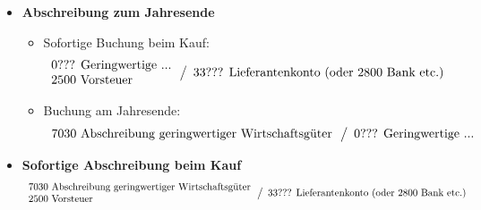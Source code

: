 \documentclass[a4paper,10pt]{report}
\begin{document}
\begin{itemize}
  \item { \textbf{Abschreibung zum Jahresende} }
  \begin{itemize}
    \item { Sofortige Buchung beim Kauf:\\
        \begin{equation*}
          \begin{array}{l}
            \text{0??? Geringwertige ...}\\
            \text{2500 Vorsteuer}\\
          \end{array}
          \left\slash
            \begin{array}{l}
              \text{33??? Lieferantenkonto (oder 2800 Bank etc.)}\\
            \end{array}
          \right.
        \end{equation*}
      }
    \item { Buchung am Jahresende:\\
        \begin{equation*}
          \begin{array}{l}
            \text{7030 Abschreibung geringwertiger Wirtschaftsgüter}\\
          \end{array}
          \left\slash
            \begin{array}{l}
              \text{0??? Geringwertige ...}\\
            \end{array}
          \right.
        \end{equation*}
      }
  \end{itemize}
  \item { \textbf{Sofortige Abschreibung beim Kauf}\\
      \begin{equation*}
        \begin{array}{l}
          \text{7030 Abschreibung geringwertiger Wirtschaftsgüter}\\
          \text{2500 Vorsteuer}\\
        \end{array}
        \left\slash
          \begin{array}{l}
            \text{33??? Lieferantenkonto (oder 2800 Bank etc.)}\\
          \end{array}
        \right.
      \end{equation*}
  }
\end{itemize}
\end{document}

